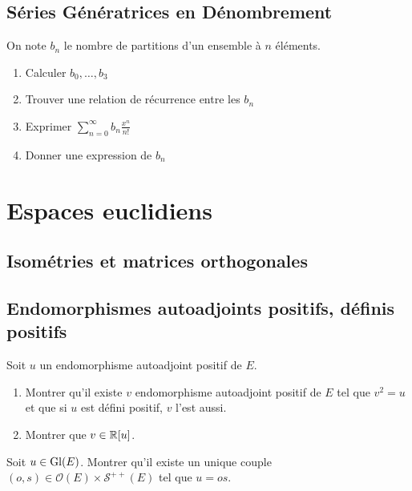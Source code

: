 \documentclass[12pt,a4paper]{exo_book}
\begin{document}
\section{Séries Génératrices en Dénombrement}

\begin{exo}
    On note $b_{n}$ le nombre de partitions d'un ensemble à $n$ éléments.
    \begin{enumerate}
        \item Calculer $b_{0}, \dots, b_{3}$
        \item Trouver une relation de récurrence entre les $b_{n}$
        \item Exprimer $\sum\limits_{n=0}^{\infty}b_{n}\frac{x^{n}}{n!}$
        \item Donner une expression de $b_{n}$
    \end{enumerate}
\end{exo}

\chapter{Espaces euclidiens}

\section{Isométries et matrices orthogonales}

\section{Endomorphismes autoadjoints positifs, définis positifs}

\begin{exo}
    Soit $u$ un endomorphisme autoadjoint positif de $E$.
    \begin{enumerate}
        \item Montrer qu'il existe $v$ endomorphisme autoadjoint positif de $E$ tel que $v^2 = u$ et que si $u$ est défini positif, $v$ l'est aussi.
        \item Montrer que $v \in \mathbb{R} [u]$.
    \end{enumerate}
\end{exo}

\begin{exo}
    Soit $u \in \operatorname{Gl} (E)$. Montrer qu'il existe un unique couple $(o, s) \in \mathcal{O}(E) \times \mathcal{S}^{++} (E)$ tel que $u=os$.
\end{exo}
\end{document}
